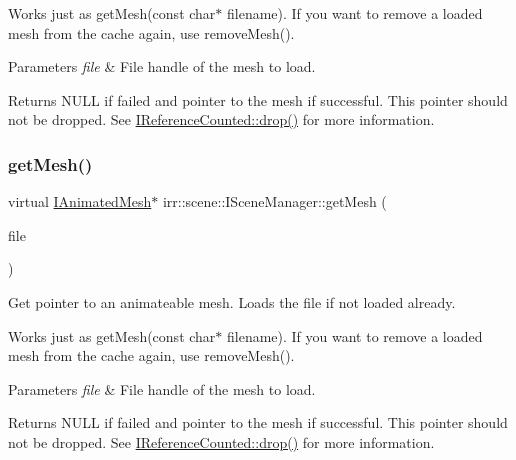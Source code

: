Works just as get\+Mesh(const char$\ast$ filename). If you want to remove a loaded mesh from the cache again, use remove\+Mesh(). 
\begin{DoxyParams}{Parameters}
{\em file} & File handle of the mesh to load. \\
\hline
\end{DoxyParams}
\begin{DoxyReturn}{Returns}
N\+U\+LL if failed and pointer to the mesh if successful. This pointer should not be dropped. See \hyperlink{classirr_1_1IReferenceCounted_a03856a09355b89d178090c4a5f738543}{I\+Reference\+Counted\+::drop()} for more information. 
\end{DoxyReturn}
\mbox{\label{classirr_1_1scene_1_1ISceneManager_af0ff82d7bac969d6a30f67c7b1fa0c46}} 
\subsubsection{\texorpdfstring{get\+Mesh()}{getMesh()}\hspace{0.1cm}{\footnotesize\ttfamily [4/4]}}
{\footnotesize\ttfamily virtual \hyperlink{classirr_1_1scene_1_1IAnimatedMesh}{I\+Animated\+Mesh}$\ast$ irr\+::scene\+::\+I\+Scene\+Manager\+::get\+Mesh (\begin{DoxyParamCaption}\item[{\hyperlink{classirr_1_1io_1_1IReadFile}{io\+::\+I\+Read\+File} $\ast$}]{file }\end{DoxyParamCaption})\hspace{0.3cm}{\ttfamily [pure virtual]}}



Get pointer to an animateable mesh. Loads the file if not loaded already. 

Works just as get\+Mesh(const char$\ast$ filename). If you want to remove a loaded mesh from the cache again, use remove\+Mesh(). 
\begin{DoxyParams}{Parameters}
{\em file} & File handle of the mesh to load. \\
\hline
\end{DoxyParams}
\begin{DoxyReturn}{Returns}
N\+U\+LL if failed and pointer to the mesh if successful. This pointer should not be dropped. See \hyperlink{classirr_1_1IReferenceCounted_a03856a09355b89d178090c4a5f738543}{I\+Reference\+Counted\+::drop()} for more information. 
\end{DoxyReturn}
\mbox{\label{classirr_1_1scene_1_1ISceneManager_a45d89c816e33abe0e77eb063d7ce58a8}} 
